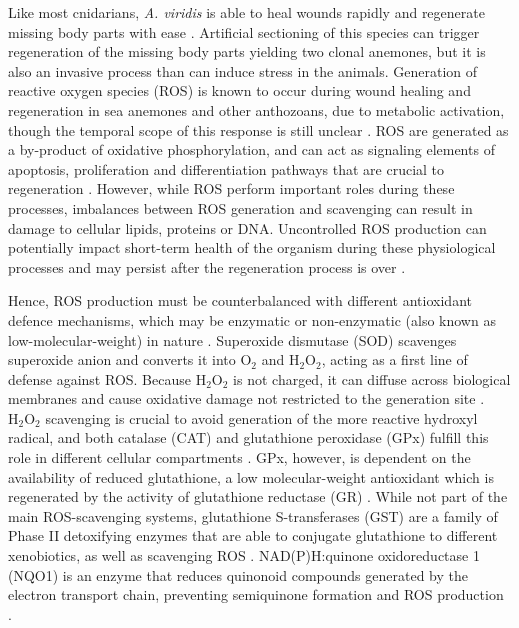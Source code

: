 \documentclass[final,3p,times,authoryear]{elsarticle}
\begin{document}
Like most cnidarians, \textit{A. viridis} is able to heal wounds rapidly and regenerate missing body parts with ease \citep{Parisi2020, LaCorte2023}. Artificial sectioning of this species can trigger regeneration of the missing body parts yielding two clonal anemones, but it is also an invasive process than can induce stress in the animals. Generation of reactive oxygen species (ROS) is known to occur during wound healing and regeneration in sea anemones and other anthozoans, due to metabolic activation, though the temporal scope of this response is still unclear   \citep{Mydlarz2006, Parisi2020, LaCorte2023, Vullein2024, Mack2025}. ROS are generated as a by-product of oxidative phosphorylation, and can act as signaling elements of apoptosis, proliferation and differentiation pathways that are crucial to regeneration \citep{Gauron2013, Vullein2024, Mack2025, Vullien2025}.  However, while ROS perform important roles during these processes, imbalances between ROS generation and scavenging can result in damage to cellular lipids, proteins or DNA. Uncontrolled ROS production can potentially impact short-term health of the organism during these physiological processes and may persist after the regeneration process is over \citep{Lesser2006, Lushchak2011}.

Hence, ROS production must be counterbalanced with different antioxidant defence mechanisms, which may be enzymatic or non-enzymatic (also known as low-molecular-weight) in nature \citep{Lesser2006}.  Superoxide dismutase (SOD) scavenges superoxide anion and converts it into $\mathrm{O_2}$  and $\mathrm{H_2O_2}$, acting as a first line of defense against ROS. Because $\mathrm{H_2O_2}$ is not charged, it can diffuse across biological membranes and cause oxidative damage not restricted to the generation site \citep{Lesser2006}. $\mathrm{H_2O_2}$ scavenging is crucial to avoid generation of the more reactive hydroxyl radical, and both catalase (CAT) and glutathione peroxidase (GPx) fulfill this role in different cellular compartments \citep{Lesser2006, Lushchak2011}. GPx, however, is dependent on the availability of reduced glutathione, a low molecular-weight antioxidant which is regenerated by the activity of glutathione reductase (GR) \citep{Couto2016}. While not part of the main ROS-scavenging systems, glutathione S-transferases (GST) are a family of Phase II detoxifying enzymes that are able to conjugate glutathione to different xenobiotics, as well as scavenging ROS \citep{Couto2016}. NAD(P)H:quinone oxidoreductase 1 (NQO1) is an enzyme that reduces quinonoid compounds generated by the electron transport chain, preventing semiquinone formation and ROS production \citep{Atia2020, Ross2021}.
\end{document}
